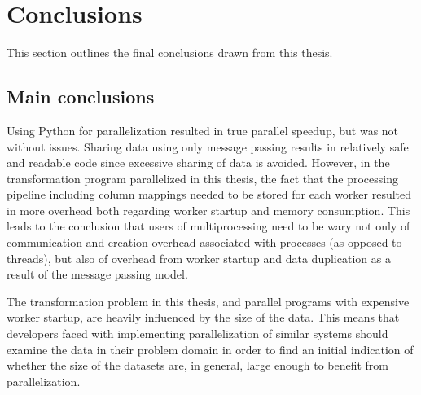 

\section{Conclusions}
This section outlines the final conclusions drawn from this thesis.

\subsection{Main conclusions}
Using Python  for parallelization resulted in true parallel speedup, but was not without issues.
Sharing data using only message passing results in relatively safe and readable code since excessive sharing of data is avoided.
However, in the transformation program parallelized in this thesis, the fact that the processing pipeline including column mappings
needed to be stored for each worker resulted in more overhead both regarding worker startup and memory consumption. This
leads to the conclusion that users of multiprocessing need to be wary not only of communication and creation overhead associated
with processes (as opposed to threads), but also of overhead from worker startup and data duplication as a result of the message
passing model.

The transformation problem in this thesis, and parallel programs with expensive worker startup, are heavily influenced by the size
of the data. This means that developers faced with implementing parallelization of similar systems should examine the data in their
problem domain in order to find an initial indication of whether the size of the datasets are, in general, large enough to benefit
from parallelization.

